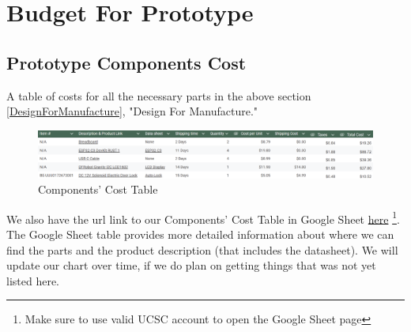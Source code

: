 \section{Budget For Prototype}

\subsection{Prototype Components Cost}

A table of costs for all the necessary parts in the above section \ref{DesignForManufacture}, "Design For Manufacture."

\begin{figure}[!htbp]
    \centering
    \includegraphics[width=1\linewidth]{./img/Budget_Table.png}
    \caption{Components' Cost Table}
    \label{fig:ComponentsCostFig}
\end{figure}

We also have the url link to our Components' Cost Table in Google Sheet \href{https://docs.google.com/spreadsheets/d/1MM1I6pMeTvkLUvmaVntZBH55sUJj1Fe8FqNDRRbwthA/edit?usp=sharing}{here} \footnote{Make sure to use valid UCSC account to open the Google Sheet page}. The Google Sheet table provides more detailed information about where we can find the parts and the product description (that includes the datasheet). We will update our chart over time, if we do plan on getting things that was not yet listed here.
